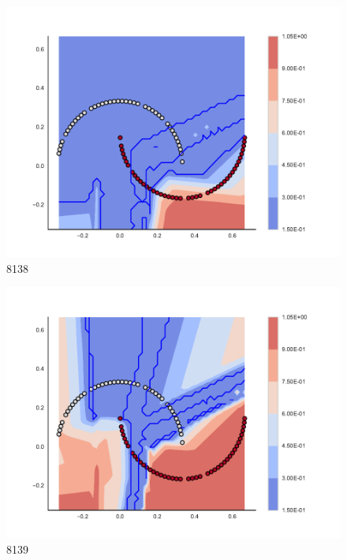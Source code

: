 \begin{subfigure}[b]{0.09\textwidth}
    \includegraphics[clip, trim=2.35cm 1.75cm 4.5cm 0cm,width=\textwidth]{img/convergence/8138.pdf}
    \caption{8138}
    \label{fig:convergence_8138}
\end{subfigure}
%
\begin{subfigure}[b]{0.09\textwidth}
    \includegraphics[clip, trim=2.35cm 1.75cm 4.5cm 0cm,width=\textwidth]{img/convergence/8139.pdf}
    \caption{8139}
    \label{fig:convergence_8139}
\end{subfigure}
%
